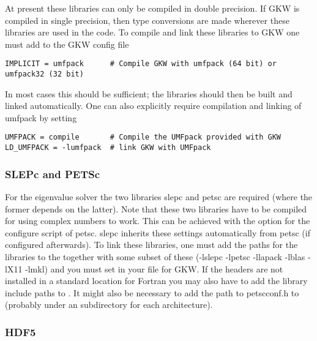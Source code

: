 At present these libraries can only be compiled in double precision. 
If GKW is compiled in single precision, then type conversions are made 
wherever these libraries are used in the code.  
To compile and link these libraries to GKW one must add to the GKW config file
\begin{verbatim}
IMPLICIT = umfpack      # Compile GKW with umfpack (64 bit) or umfpack32 (32 bit)
\end{verbatim}
In most cases this should be sufficient; the libraries should then be built and linked automatically.   
One can also explicitly require compilation and linking of umfpack by setting
\begin{verbatim}
UMFPACK = compile       # Compile the UMFpack provided with GKW
LD_UMFPACK = -lumfpack  # link GKW with UMFpack
\end{verbatim}



\subsubsection{\label{subsubsec:slepc}SLEPc and PETSc}

For the eigenvalue solver the two libraries {\sc slep}c and {\sc pets}c are required
(where the former depends on the latter).
Note that these two libraries have to be compiled for using complex numbers
to work. This can be achieved with the option
 for the configure script of {\sc pets}c. {\sc slep}c
inherits these settings automatically from {\sc pets}c (if configured afterwards).
To link these libraries, one must add the paths for the libraries to the  together
with some subset of these (-lslepc -lpetsc -llapack -lblas -lX11 -lmkl) and
you must set  in your  file for GKW.  
If the headers are not installed in a standard location for Fortran
you may also have to add the library include paths to .  
It might also be necessary to add the path to petscconf.h to  
(probably under an  subdirectory for each architecture).


\subsubsection{HDF5}\label{sec:hdf5}

